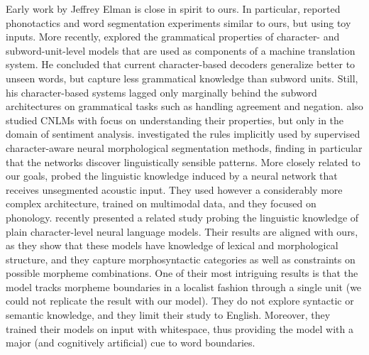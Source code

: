 Early work by Jeffrey Elman is close in spirit to ours. In particular,
 reported phonotactics and word segmentation
experiments similar to ours, but using toy inputs. More recently,
 explored the grammatical properties of
character- and subword-unit-level models that are used as components
of a machine translation system. He concluded that current
character-based decoders generalize better to unseen words, but
capture less grammatical knowledge than subword units. Still, his
character-based systems lagged only marginally behind the subword
architectures on grammatical tasks such as handling agreement and
negation.  also studied CNLMs with focus on understanding their
properties, but only in the domain of sentiment
analysis.  investigated the rules implicitly
used by supervised character-aware neural morphological segmentation
methods, finding in particular that the networks discover
linguistically sensible patterns. More closely related to our goals,
 probed the linguistic knowledge induced by
a neural network that receives unsegmented acoustic input. They used
however a considerably more complex architecture, trained on
multimodal data, and they focused on phonology.  recently presented a related study
probing the linguistic knowledge of plain character-level neural
language models. Their results are aligned with ours, as they show
that these models have knowledge of lexical and morphological
structure, and they capture morphosyntactic categories as well as
constraints on possible morpheme combinations. One of their most
intriguing results is that the model tracks morpheme boundaries in a
localist fashion through a single unit (we could not replicate the
result with our model).  They do not explore syntactic or semantic
knowledge, and they limit their study to English. Moreover, they
trained their models on input with whitespace, thus providing the
model with a major (and cognitively artificial) cue to word
boundaries.


